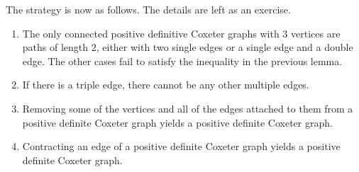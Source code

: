 The strategy is now as follows. The details are left as an exercise.
\begin{enumerate}
	\item The only connected positive definitive Coxeter graphs with $3$
		vertices are paths of length $2$, either with two single edges or
		a single edge and a double edge. The other cases fail to satisfy the
		inequality in the previous lemma.

	\item If there is a triple edge, there cannot be any other multiple edges.

	\item Removing some of the vertices and all of the edges attached to them from
		a positive definite Coxeter graph yields a positive definite Coxeter
		graph.

	\item Contracting an edge of a positive definite Coxeter graph yields a
		positive definite Coxeter graph.


\end{enumerate}
